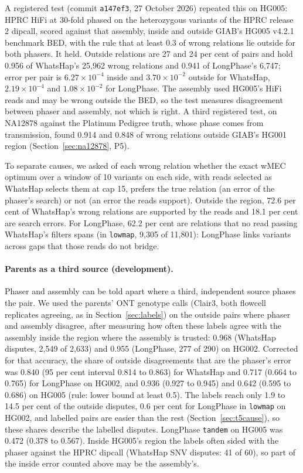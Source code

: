 \documentclass[11pt]{article}
\theoremstyle{definition}
\theoremstyle{remark}
\begin{document}
A registered test (commit \texttt{a147ef3}, 27 October 2026) repeated this
on HG005: HPRC HiFi at 30-fold phased on the heterozygous variants of the
HPRC release 2 dipcall, scored against that assembly, inside and outside
GIAB's HG005 v4.2.1 benchmark BED, with the rule that at least 0.3 of wrong
relations lie outside for both phasers. It held. Outside relations are 27
and 24 per cent of pairs and hold 0.956 of WhatsHap's 25{,}962 wrong
relations and 0.941 of LongPhase's 6{,}747; error per pair is
$6.27\times10^{-4}$ inside and $3.70\times10^{-2}$ outside for WhatsHap,
$2.19\times10^{-4}$ and $1.08\times10^{-2}$ for LongPhase. The assembly used
HG005's HiFi reads and may be wrong outside the BED, so the test measures
disagreement between phaser and assembly, not which is right. A third
registered test, on NA12878 against the Platinum Pedigree truth, whose
phase comes from transmission, found 0.914 and 0.848 of wrong relations
outside GIAB's HG001 region (Section~\ref{sec:na12878}, P5).

To separate causes, we asked of each wrong relation whether the exact wMEC
optimum over a window of 10 variants on each side, with reads selected as
WhatsHap selects them at cap 15, prefers the true relation (an error of the
phaser's search) or not (an error the reads support). Outside the region,
72.6 per cent of WhatsHap's wrong relations are supported by the reads and
18.1 per cent are search errors. For LongPhase, 62.2 per cent are relations
that no read passing WhatsHap's filters spans (in \texttt{lowmap}, 9{,}305 of
11{,}801): LongPhase links variants across gaps that those reads do not
bridge.

\paragraph{Parents as a third source (development).} Phaser and assembly
can be told apart where a third, independent source phases the pair. We
used the parents' ONT genotype calls (Clair3, both flowcell replicates
agreeing, as in Section~\ref{sec:labels}) on the outside pairs where phaser
and assembly disagree, after measuring how often these labels agree with the
assembly inside the region where the assembly is trusted: 0.968 (WhatsHap
disputes, 2{,}549 of 2{,}633) and 0.955 (LongPhase, 277 of 290) on HG002.
Corrected for that accuracy, the share of outside disagreements that are
the phaser's error was 0.840 (95 per cent interval 0.814 to 0.863) for
WhatsHap and 0.717 (0.664 to 0.765) for LongPhase on HG002, and 0.936 (0.927
to 0.945) and 0.642 (0.595 to 0.686) on HG005 (rule: lower bound at least
0.5). The labels reach only 1.9 to 14.5 per cent of the outside disputes,
0.6 per cent for LongPhase in \texttt{lowmap} on HG002, and labelled pairs
are easier than the rest (Section~\ref{sec:t5cause}), so these shares
describe the labelled disputes. LongPhase \texttt{tandem} on HG005 was
0.472 (0.378 to 0.567). Inside HG005's region the labels often sided with
the phaser against the HPRC dipcall (WhatsHap SNV disputes: 41 of 60), so
part of the inside error counted above may be the assembly's.
\end{document}
